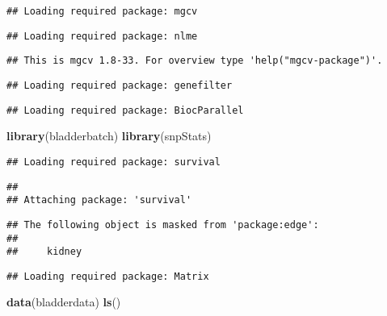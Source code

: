 \documentclass[]{article}
\newenvironment{Shaded}{\begin{snugshade}}{\end{snugshade}}
\newcommand{\KeywordTok}[1]{\textcolor[rgb]{0.13,0.29,0.53}{\textbf{#1}}}
\newcommand{\NormalTok}[1]{#1}
\begin{document}
\begin{verbatim}
## Loading required package: mgcv
\end{verbatim}

\begin{verbatim}
## Loading required package: nlme
\end{verbatim}

\begin{verbatim}
## This is mgcv 1.8-33. For overview type 'help("mgcv-package")'.
\end{verbatim}

\begin{verbatim}
## Loading required package: genefilter
\end{verbatim}

\begin{verbatim}
## Loading required package: BiocParallel
\end{verbatim}

\begin{Shaded}
\begin{Highlighting}[]
\KeywordTok{library}\NormalTok{(bladderbatch)}
\KeywordTok{library}\NormalTok{(snpStats)}
\end{Highlighting}
\end{Shaded}

\begin{verbatim}
## Loading required package: survival
\end{verbatim}

\begin{verbatim}
## 
## Attaching package: 'survival'
\end{verbatim}

\begin{verbatim}
## The following object is masked from 'package:edge':
## 
##     kidney
\end{verbatim}

\begin{verbatim}
## Loading required package: Matrix
\end{verbatim}

\begin{Shaded}
\begin{Highlighting}[]
\KeywordTok{data}\NormalTok{(bladderdata)}
\KeywordTok{ls}\NormalTok{()}
\end{Highlighting}
\end{Shaded}
\end{document}
